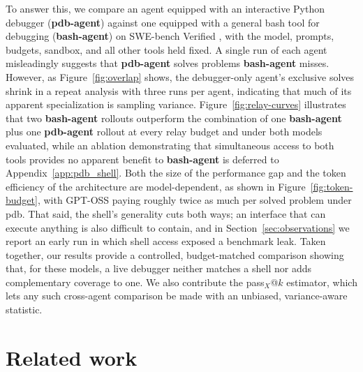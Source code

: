 \documentclass{article}
\begin{document}
To answer this, we compare an agent equipped with an interactive Python debugger (\textbf{pdb-agent}) against one equipped with a general bash tool for debugging (\textbf{bash-agent}) on SWE-bench Verified \cite{jimenez2024swebench,openai2024swebenchverified}, with the model, prompts, budgets, sandbox, and all other tools held fixed. A single run of each agent misleadingly suggests that \textbf{pdb-agent} solves problems \textbf{bash-agent} misses. However, as Figure~\ref{fig:overlap} shows, the debugger-only agent's exclusive solves shrink in a repeat analysis with three runs per agent, indicating that much of its apparent specialization is sampling variance. Figure~\ref{fig:relay-curves} illustrates that two \textbf{bash-agent} rollouts outperform the combination of one \textbf{bash-agent} plus one \textbf{pdb-agent} rollout at every relay budget and under both models evaluated, while an ablation demonstrating that simultaneous access to both tools provides no apparent benefit to \textbf{bash-agent} is deferred to Appendix~\ref{app:pdb_shell}. Both the size of the performance gap and the token efficiency of the architecture are model-dependent, as shown in Figure~\ref{fig:token-budget}, with GPT-OSS paying roughly twice as much per solved problem under pdb. That said, the shell's generality cuts both ways; an interface that can execute anything is also difficult to contain, and in Section~\ref{sec:observations} we report an early run in which shell access exposed a benchmark leak. Taken together, our results provide a controlled, budget-matched comparison showing that, for these models, a live debugger neither matches a shell nor adds complementary coverage to one. We also contribute the pass$_X$@$k$ estimator, which lets any such cross-agent comparison be made with an unbiased, variance-aware statistic.

\section{Related work}
\end{document}
